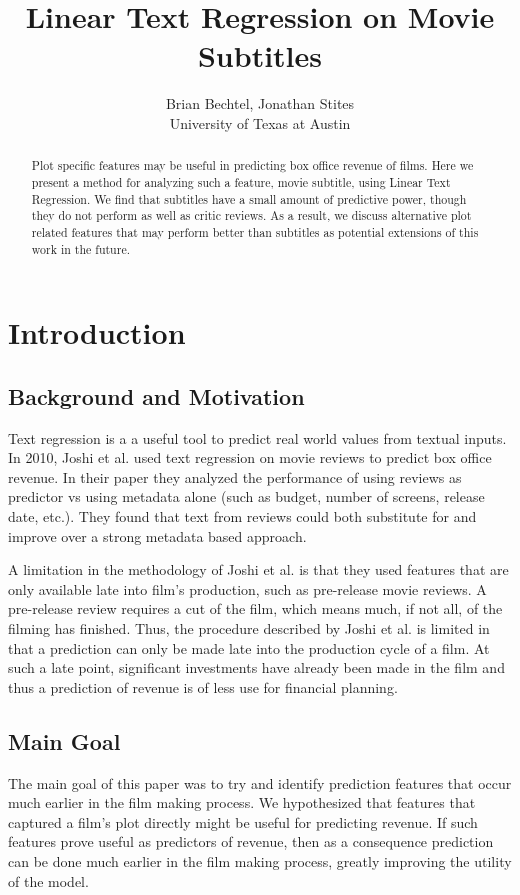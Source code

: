 \documentclass[11pt]{article}
\begin{document}
\title{Linear Text Regression on Movie Subtitles}
\author{Brian Bechtel, Jonathan Stites\\
       University of Texas at Austin}
\date{}

\maketitle

\begin{abstract}
\noindent
Plot specific features may be useful in predicting box office revenue of films.
Here we present a method for analyzing such a feature, movie subtitle, using Linear Text Regression. We find that subtitles have a small amount of predictive power, though they
do not perform as well as critic reviews. As a result, we discuss alternative plot related
features that may perform better than subtitles as potential extensions of this work in the
future.
\end{abstract}

\section{Introduction}
\subsection{Background and Motivation}
Text regression is a a useful tool to predict real world values from textual inputs.
In 2010, Joshi et al. used text regression on movie reviews to predict box office revenue.
In their paper they analyzed the performance of using reviews as predictor vs using metadata 
alone (such as budget, number of screens, release date, etc.). They found that text
from reviews could both substitute for and improve over a strong metadata based approach.

A limitation in the methodology of Joshi et al. is that they used features that are only
available late into film's production, such as pre-release movie reviews. A pre-release
review requires a cut of the film, which means much, if not all, of the filming has
finished. Thus, the procedure described by Joshi et al. is limited in that a prediction
can only be made late into the production cycle of a film. At such a late point,
significant investments have already been made in the film and thus a prediction of
revenue is of less use for financial planning.

\subsection{Main Goal}
The main goal of this paper was to try and identify prediction features that occur much
earlier in the film making process. We hypothesized that features that captured a film's
plot directly might be useful for predicting revenue. If such features prove useful as
predictors of revenue, then as a consequence prediction can be done much earlier in the
film making process, greatly improving the utility of the model.
\end{document}
